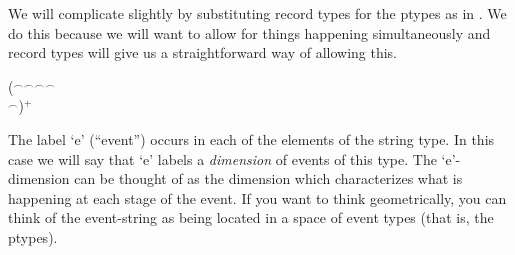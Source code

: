  
 
 
   


We will complicate \preveg{} slightly by substituting record types for
the ptypes as in \nexteg{}.  We do this because we
will want to allow for things happening simultaneously and record
types will give us a straightforward way of allowing this.
\begin{ex} 
($^{\frown}$$^{\frown}$$^{\frown}$$^{\frown}$\\
$^{\frown}$)$^+$ 
\label{eg:fetch-type}
\end{ex}
The label `e' (``event'') occurs in each of the elements of the string
type.  In this case we will say that `e' labels a \textit{dimension}
of events of this type.  The `e'-dimension can be thought of as the
dimension which characterizes what is happening at each stage of the
event.  If you want to think geometrically, you can think of the
event-string as being located in a space of event types (that is, the ptypes).

